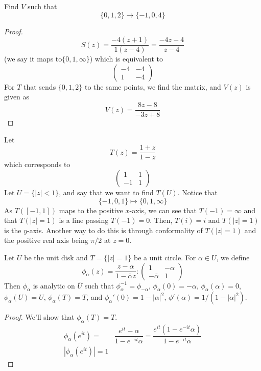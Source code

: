 \vspace{2ex}
\begin{ex}
Find $V$ such that
\[\{0,1,2\}\rightarrow \{-1,0,4\}\]
\end{ex}
\vspace{2ex}
\begin{proof}
\[S(z)=\dfrac{-4(z+1)}{1(z-4)}=\dfrac{-4z-4}{z-4}\]
(we say it maps to$\{0,1,\infty \}$) which is equivalent to
\[\begin{pmatrix}
-4&-4\\1&-4
\end{pmatrix}
\]
For $T$ that sends $\{0,1,2\}$ to the same points, we find the matrix, and $V(z)$ is given as
\[V(z)=\dfrac{8z-8}{-3z+8}\]
\end{proof}
\vspace{2ex}
\begin{ex}
Let 
\[T(z)=\dfrac{1+z}{1-z}\]
which corresponds to 
\[\begin{pmatrix}
1&1\\-1&1
\end{pmatrix}
\]
Let $U=\{|z|<1\}$, and say that we want to find $T(U)$. Notice that 
\[\{-1,0,1\}\mapsto \{0,1,\infty \}\]
As $T([-1,1])$ maps to the positive $x$-axis, we can see that $T(-1)=\infty $ and that $T(|z|=1)$ is a line passing $T(-1)=0$. Then, $T(i)=i$ and $T(|z|=1)$ is the $y$-axis. Another way to do this is through conformality of $T(|z|=1)$ and the positive real axis being $\pi /2$ at $z=0$.
\end{ex}
\vspace{2ex}
\begin{defi}
Let $U$ be the unit disk and $T=\{|z|=1\}$ be a unit circle. For $\alpha \in U$, we define
\[\phi _{\alpha }(z)=\dfrac{z-\alpha }{1-\bar{\alpha }z}:\begin{pmatrix}
1&-\alpha \\
-\bar{\alpha }&1
\end{pmatrix}
\]
Then $\phi _{\alpha }$ is analytic on $\bar{U}$ such that $\phi ^{-1}_{\alpha }=\phi _{-\alpha }$, $\phi _{\alpha }(0)=-\alpha $, $\phi_{\alpha }(\alpha )=0$, $\phi _{\alpha }(U)=U$, $\phi _{\alpha }(T)=T$, and $\phi _{\alpha }'(0)=1-|\alpha |^2$, $\phi '(\alpha )=1/(1-|\alpha |^2)$.
\end{defi}
\vspace{2ex}
\begin{proof}
We'll show that $\phi _{\alpha }(T)=T$.
\[\begin{align*}
\phi _{\alpha }(e^{it})=&\dfrac{e^{it}-\alpha }{1-e^{-it}\bar{\alpha }}=\dfrac{e^{it}(1-e^{-it}\alpha )}{1-e^{-it}\bar{\alpha }}\\
|\phi _{\alpha }(e^{it})|=1
\end{align*}\]

\end{proof}
\vspace{2ex}

